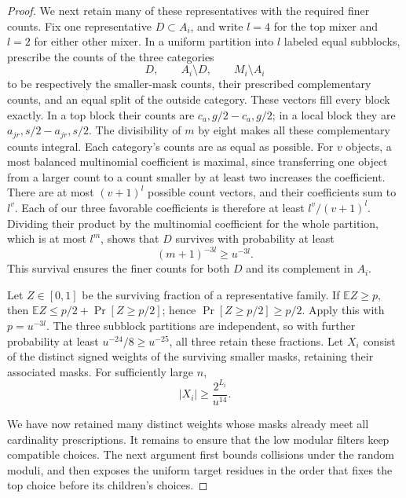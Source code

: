 \begin{proof}
We next retain many of these representatives with the required finer
counts. Fix one representative \(D\subset A_i\), and write \(l=4\)
for the top mixer and \(l=2\) for either other mixer. In a uniform
partition into \(l\) labeled equal subblocks, prescribe the counts of
the three categories
\[
 D,\qquad A_i\setminus D,\qquad M_i\setminus A_i
\]
to be respectively the smaller-mask counts, their prescribed
complementary counts, and an equal split of the outside category.
These vectors fill every block exactly. In a top block their counts
are \(c_a,g/2-c_a,g/2\); in a local block they are
\(a_{jr},s/2-a_{jr},s/2\). The divisibility of \(m\) by eight makes
all these complementary counts integral. Each category's counts are
as equal as possible. For \(v\) objects,
a most balanced multinomial coefficient is maximal, since transferring
one object from a larger count to a count smaller by at least two
increases the coefficient. There are at most \((v+1)^l\) possible
count vectors, and their coefficients sum to \(l^v\). Each of our
three favorable coefficients is therefore at least
\(l^v/(v+1)^l\). Dividing their product by the multinomial coefficient
for the whole partition, which is at most \(l^m\), shows that \(D\)
survives with probability at least
\[
 (m+1)^{-3l}\ge u^{-3l}.
\]
This survival ensures the finer counts for both \(D\) and its
complement in \(A_i\).

Let \(Z\in[0,1]\) be the surviving fraction of a representative
family. If \(\mathbb EZ\ge p\), then
\(\mathbb EZ\le p/2+\Pr[Z\ge p/2]\); hence
\(\Pr[Z\ge p/2]\ge p/2\). Apply this with \(p=u^{-3l}\).
The three subblock partitions are independent, so with further
probability at least \(u^{-24}/8\ge u^{-25}\), all three retain
these fractions. Let \(X_i\) consist of the distinct signed weights of
the surviving smaller masks, retaining their associated masks. For
sufficiently large \(n\),
\begin{equation}\label{surv:representative-count}
 |X_i|\ge \frac{2^{L_i}}{u^{14}}.
\end{equation}

We have now retained many distinct weights whose masks already meet
all cardinality prescriptions. It remains to ensure that the low
modular filters keep compatible choices. The next argument first
bounds collisions under the random moduli, and then exposes the
uniform target residues in the order that fixes the top choice before
its children's choices.


\end{proof}
